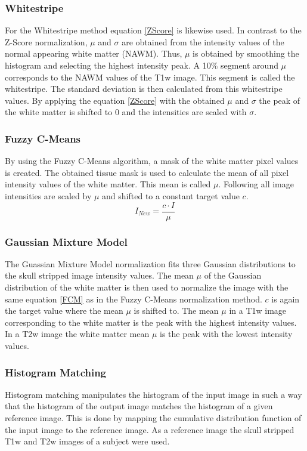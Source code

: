 \documentclass[journal]{IEEEtran}
\begin{document}
	\subsubsection{Whitestripe}
	For the Whitestripe method equation \ref{ZScore} is likewise used. In contrast to the Z-Score normalization, $\mu$ and $\sigma$ are obtained from the intensity values of the normal appearing white matter (NAWM). 
	Thus, $\mu$ is obtained by smoothing the histogram and selecting the highest intensity peak. A 10\% segment around $\mu$ corresponds to the NAWM values of the T1w image. This segment is called the whitestripe.
	The standard deviation is then calculated from this whitestripe values.
 	By applying the equation \ref{ZScore} with the obtained $\mu$ and $\sigma$ the peak of the white matter is shifted to 0 and the intensities are scaled with $\sigma$.
	\smallskip
		
	\subsubsection{Fuzzy C-Means}
	By using the Fuzzy C-Means algorithm, a mask of the white matter pixel values is created. 
	The obtained tissue mask is used to calculate the mean of all pixel intensity values of the white matter. This mean is called $\mu$.
	Following all image intensities are scaled by $\mu$ and shifted to a constant target value $c$.
		\begin{equation}
			I_{New} = \frac{c \cdot I}{\mu}
		\end{equation}
	
	\subsubsection{Gaussian Mixture Model}
	The Guassian Mixture Model normalization fits three Gaussian distributions to the skull stripped image intensity values. 
	The mean $\mu$ of the Gaussian distribution of the white matter is then used to normalize the image with the same equation \ref{FCM} as in the Fuzzy C-Means normalization method. 
	$c$ is again the target value where the mean $\mu$ is shifted to. 
	The mean $\mu$ in a T1w image corresponding to the white matter is the peak with the highest intensity values. 
	In a T2w image the white matter mean $\mu$ is the peak with the lowest intensity values. 
	\smallskip

	\subsubsection{Histogram Matching}
	Histogram matching manipulates the histogram of the input image in such a way that the histogram of the output image matches the histogram of a given reference image. 
	This is done by mapping the cumulative distribution function of the input image to the reference image.
	As a reference image the skull stripped T1w and T2w images of a subject were used. 
	\smallskip
	
\end{document}
